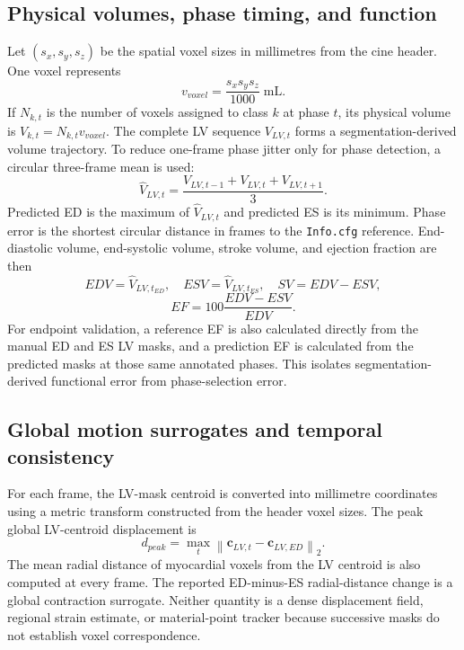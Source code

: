 \subsection{Physical volumes, phase timing, and function}
Let $(s_x,s_y,s_z)$ be the spatial voxel sizes in millimetres from the cine header. One voxel represents
\begin{equation}
    v_{voxel}=\frac{s_xs_ys_z}{1000}\;\mathrm{mL}.
\end{equation}
If $N_{k,t}$ is the number of voxels assigned to class $k$ at phase $t$, its physical volume is $V_{k,t}=N_{k,t}v_{voxel}$. The complete LV sequence $V_{LV,t}$ forms a segmentation-derived volume trajectory. To reduce one-frame phase jitter only for phase detection, a circular three-frame mean is used:
\begin{equation}
    \widehat{V}_{LV,t}=\frac{V_{LV,t-1}+V_{LV,t}+V_{LV,t+1}}{3}.
\end{equation}
Predicted ED is the maximum of $\widehat{V}_{LV,t}$ and predicted ES is its minimum. Phase error is the shortest circular distance in frames to the \texttt{Info.cfg} reference. End-diastolic volume, end-systolic volume, stroke volume, and ejection fraction are then
\begin{equation}
    EDV=\widehat{V}_{LV,t_{ED}},\quad ESV=\widehat{V}_{LV,t_{ES}},\quad SV=EDV-ESV,
\end{equation}
\begin{equation}
    EF=100\frac{EDV-ESV}{EDV}.
\end{equation}
For endpoint validation, a reference EF is also calculated directly from the manual ED and ES LV masks, and a prediction EF is calculated from the predicted masks at those same annotated phases. This isolates segmentation-derived functional error from phase-selection error.

\subsection{Global motion surrogates and temporal consistency}
For each frame, the LV-mask centroid is converted into millimetre coordinates using a metric transform constructed from the header voxel sizes. The peak global LV-centroid displacement is
\begin{equation}
    d_{peak}=\max_t\left\lVert\mathbf{c}_{LV,t}-\mathbf{c}_{LV,ED}\right\rVert_2.
\end{equation}
The mean radial distance of myocardial voxels from the LV centroid is also computed at every frame. The reported ED-minus-ES radial-distance change is a global contraction surrogate. Neither quantity is a dense displacement field, regional strain estimate, or material-point tracker because successive masks do not establish voxel correspondence.

